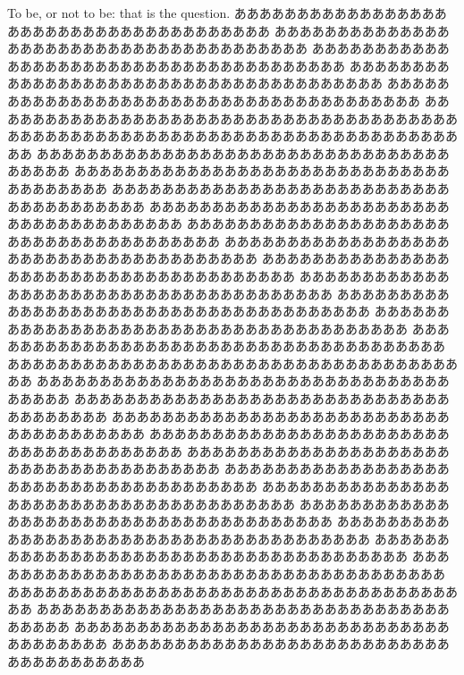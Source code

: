 \documentclass{classes/resume}
\begin{document}
To be, or not to be: that is the question.
ああああああああああああああああああああああああああああああああああああああ
ああああああああああああああああああああああああああああああああああああああ
ああああああああああああああああああああああああああああああああああああああ
ああああああああああああああああああああああああああああああああああああああ
ああああああああああああああああああああああああああああああああああああああ
ああああああああああああああああああああああああああああああああああああああ
ああああああああああああああああああああああああああああああああああああああ
ああああああああああああああああああああああああああああああああああああああ
ああああああああああああああああああああああああああああああああああああああ
ああああああああああああああああああああああああああああああああああああああ
ああああああああああああああああああああああああああああああああああああああ
ああああああああああああああああああああああああああああああああああああああ
ああああああああああああああああああああああああああああああああああああああ
ああああああああああああああああああああああああああああああああああああああ
ああああああああああああああああああああああああああああああああああああああ
ああああああああああああああああああああああああああああああああああああああ
ああああああああああああああああああああああああああああああああああああああ
ああああああああああああああああああああああああああああああああああああああ
ああああああああああああああああああああああああああああああああああああああ
ああああああああああああああああああああああああああああああああああああああ
ああああああああああああああああああああああああああああああああああああああ
ああああああああああああああああああああああああああああああああああああああ
ああああああああああああああああああああああああああああああああああああああ
ああああああああああああああああああああああああああああああああああああああ
ああああああああああああああああああああああああああああああああああああああ
ああああああああああああああああああああああああああああああああああああああ
ああああああああああああああああああああああああああああああああああああああ
ああああああああああああああああああああああああああああああああああああああ
ああああああああああああああああああああああああああああああああああああああ
ああああああああああああああああああああああああああああああああああああああ
ああああああああああああああああああああああああああああああああああああああ
ああああああああああああああああああああああああああああああああああああああ
ああああああああああああああああああああああああああああああああああああああ
ああああああああああああああああああああああああああああああああああああああ
\end{document}
